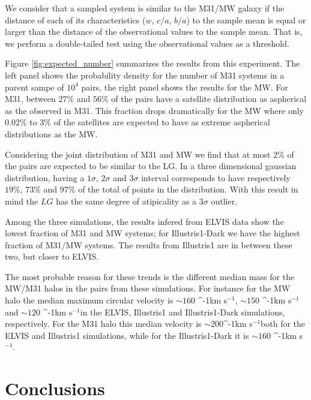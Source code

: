 \documentclass[a4paper,fleqn,usenatbib]{mnras}
\newcommand{\kms}{\ifmmode\mathrm{km\ s}^{-1}\else km s$^{-1}$\fi}
\begin{document}
We consider that a sampled system is similar to the M31/MW galaxy if the
distance of each of its characteristics ($w$, $c/a$, $b/a$) to the
sample mean is equal or larger than the distance of the observational
values to the sample mean.   
That is, we perform a double-tailed test using the observational
values as a threshold. 

Figure \ref{fig:expected_number} summarizes the results from this
experiment. The left panel shows the probability density for the number of M31
systems in a parent sampe of $10^4$ pairs, the right panel shows the
results for the MW.
For M31, between $27\%$ and $56\%$ of the pairs have a satellite
distribution as aspherical as the observed in M31. This fraction drops
dramatically for the MW where only $0.02\%$ to $3\%$ of the satellites
are expected to have as extreme aspherical distributions as the MW.

Considering the joint distribution of M31 and MW we find that at most
$2\%$ of the pairs are expected to be similar to the LG.
In a three dimensional gaussian distribution, having a $1\sigma$,
$2\sigma$ and $3\sigma$ interval corresponds to have respectively $19 \%$, $73 \%$ and
$97 \%$ of the total of points in the distribution.
With this result in mind the $LG$ has the same degree of atipicality
as a $3\sigma$ outlier. 

Among the three simulations, the results infered from ELVIS data show
the lowest fraction of M31 and MW systems; for Illustris1-Dark we have
the highest fraction of M31/MW systems. The results from Illustris1
are in between these two, but closer to ELVIS.

The most probable reason for these trends is the different median mass
for the MW/M31 halos in the pairs from these simulations. 
For instance for the MW halo the median maximum circular velocity is
$\sim 160$ \kms, $\sim 150$ \kms and $\sim 120$ \kms in the ELVIS,
Illustris1 and Illustris1-Dark simulations, respectively.
For the M31 halo this median velocity is $\sim 200$\kms both for the
ELVIS and Illustris1 simulations, while for the Illustris1-Dark it is
$\sim 160$ \kms. 


\section{Conclusions}\label{sec:conclusions}
\end{document}
